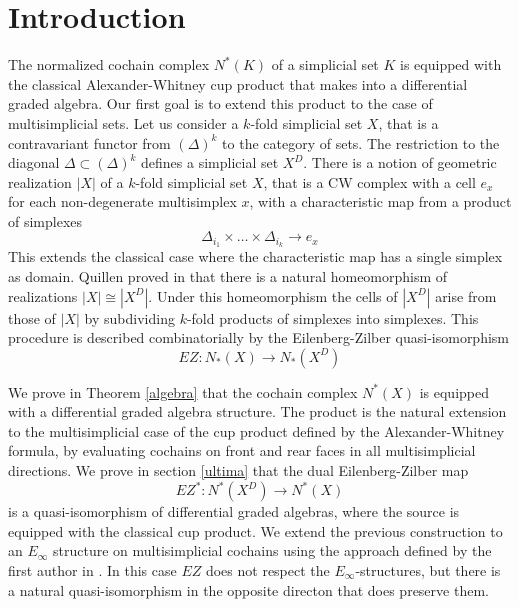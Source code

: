 
\section{Introduction} \label{s:introduction}

The normalized cochain complex $N^*(K)$ of a simplicial set $K$ is equipped with the classical Alexander-Whitney cup product that makes into a differential graded algebra.
Our first goal is to extend this product to the case of multisimplicial sets.  Let us consider a $k$-fold simplicial set $X$, that is a contravariant functor from $(\Delta)^k$ to the category of sets. The restriction to the diagonal  $\Delta \subset (\Delta)^k$ defines a simplicial set $X^D$. There is a notion 
of geometric realization $|X|$ of a $k$-fold simplicial set $X$, that is a CW complex with a cell $e_x$ for each non-degenerate multisimplex $x$, with a characteristic map from a product of simplexes  $$\Delta_{i_1} \times \dots \times \Delta_{i_k} \to e_x$$ This extends the classical case where the characteristic map has a single simplex as domain. 
Quillen proved in 
\cite{Quillen} that there is  a natural homeomorphism of realizations $|X| \cong |X^D|$. Under this homeomorphism the cells of $|X^D|$ arise from those
of $|X|$ by subdividing $k$-fold products of simplexes into simplexes. This procedure is described combinatorially by the Eilenberg-Zilber quasi-isomorphism $$EZ:N_*(X) \to N_*(X^D)$$


\medskip

 We prove in Theorem \ref{algebra}  %
 that the cochain complex $N^*(X)$ is equipped with a differential graded algebra structure.
 The product is the natural extension to the multisimplicial case of the cup product  defined by the Alexander-Whitney formula, by
  evaluating cochains on front and rear faces in all multisimplicial directions. %
  We prove in section \ref{ultima}
   that the dual Eilenberg-Zilber map
 $$EZ^*:N^*(X^D) \to N^*(X)$$ %
  is a quasi-isomorphism of differential graded algebras, where the source is equipped with the classical cup product.  
We extend the previous construction to an $E_\infty$ structure on multisimplicial cochains using the approach defined by the first author in \cite{anibal}.
In this case $EZ$ does not respect the $E_\infty$-structures, but there is a natural quasi-isomorphism in the opposite directon that does preserve them. 

